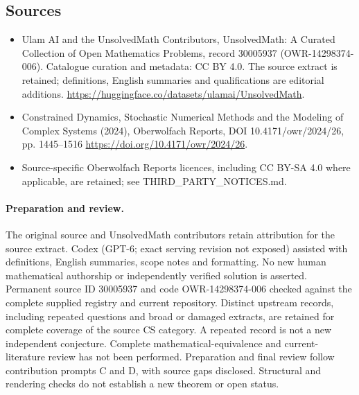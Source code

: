 \documentclass[11pt]{article}
\begin{document}
\subsection{Sources}
\begin{itemize}
\item[\hypertarget{source:30005937:1}{S1}] Ulam AI and the UnsolvedMath Contributors, UnsolvedMath: A Curated Collection of Open Mathematics Problems, record 30005937 (OWR-14298374-006). Catalogue curation and metadata: CC BY 4.0. The source extract is retained; definitions, English summaries and qualifications are editorial additions.
\url{https://huggingface.co/datasets/ulamai/UnsolvedMath}.
\item[\hypertarget{source:30005937:2}{S2}] Constrained Dynamics, Stochastic Numerical Methods and the Modeling of Complex Systems (2024), Oberwolfach Reports, DOI 10.4171/owr/2024/26, pp. 1445--1516
\url{https://doi.org/10.4171/owr/2024/26}.
\item Source-specific Oberwolfach Reports licences, including CC BY-SA 4.0 where applicable, are retained; see THIRD\_PARTY\_NOTICES.md.
\end{itemize}
\paragraph{Preparation and review.}
The original source and UnsolvedMath contributors retain attribution for the source extract. Codex (GPT-6; exact serving revision not exposed) assisted with definitions, English summaries, scope notes and formatting. No new human mathematical authorship or independently verified solution is asserted. Permanent source ID 30005937 and code OWR-14298374-006 checked against the complete supplied registry and current repository. Distinct upstream records, including repeated questions and broad or damaged extracts, are retained for complete coverage of the source CS category. A repeated record is not a new independent conjecture. Complete mathematical-equivalence and current-literature review has not been performed. Preparation and final review follow contribution prompts C and D, with source gaps disclosed. Structural and rendering checks do not establish a new theorem or open status.
\label{end:30005937}
\end{document}
